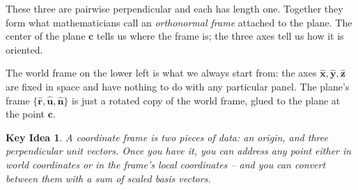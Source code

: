 \documentclass{article}
\newtheorem*{idea}{Key Idea}
\begin{document}
These three are pairwise perpendicular and each has length one. Together they
form what mathematicians call an \emph{orthonormal frame} attached to the
plane. The center of the plane $\mathbf{c}$ tells us where the frame is; the
three axes tell us how it is oriented.

\begin{center}
\end{center}

The world frame on the lower left is what we always start from: the axes
$\hat{\mathbf{x}}, \hat{\mathbf{y}}, \hat{\mathbf{z}}$ are fixed in space and
have nothing to do with any particular panel. The plane's frame
$\{\hat{\mathbf{r}}, \hat{\mathbf{u}}, \hat{\mathbf{n}}\}$ is just a rotated
copy of the world frame, glued to the plane at the point $\mathbf{c}$.

\begin{idea}
A coordinate frame is two pieces of data: an origin, and three perpendicular
unit vectors. Once you have it, you can address any point either in world
coordinates or in the frame's local coordinates -- and you can convert between
them with a sum of scaled basis vectors.
\end{idea}
\end{document}
